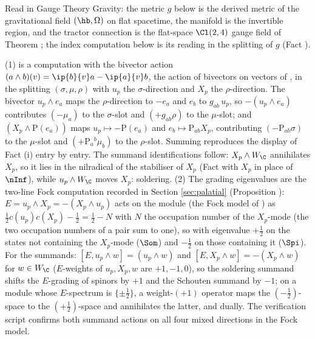 Read in Gauge Theory Gravity: the metric $g$ below is the derived metric of the gravitational field $(\hb, \Omega)$ on flat spacetime, the manifold is the invertible region, and the tractor connection is the flat-space $\Cl(2,4)$ gauge field of Theorem ; the index computation below is its reading in the splitting of $g$ (Fact ).

(1) is a computation with the bivector action $(a\wedge b)(v) = \ip{b}{v}a - \ip{a}{v}b$, the action of bivectors on vectors of , in the splitting $(\sigma, \mu, \rho)$ with $u_p$ the $\sigma$-direction and $X_p$ the $\rho$-direction. The bivector $u_p\wedge e_a$ maps the $\rho$-direction to $-e_a$ and $e_b$ to $g_{ab}\,u_p$, so $-(u_p\wedge e_a)$ contributes $(-\mu_a)$ to the $\sigma$-slot and $(+g_{ab}\rho)$ to the $\mu$-slot; and $(X_p\wedge \mathrm{P}(e_a))$ maps $u_p \mapsto -\mathrm{P}(e_a)$ and $e_b \mapsto \mathrm{P}_{ab}X_p$, contributing $(-\mathrm{P}_{ab}\sigma)$ to the $\mu$-slot and $(+\mathrm{P}_a{}^b\mu_b)$ to the $\rho$-slot. Summing reproduces the display of Fact (i) entry by entry. The summand identifications follow: $X_p\wedge W_\C$ annihilates $X_p$, so it lies in the nilradical of the stabiliser of $X_p$ (Fact  with $X_p$ in place of $\nInf$), while $u_p \wedge W_\C$ moves $X_p$: soldering.
(2) The grading eigenvalues are the two-line Fock computation recorded in Section \ref{sec:palatial} (Proposition ): $E = u_p\wedge X_p = -(X_p\wedge u_p)$ acts on the module (the Fock model of ) as $\tfrac12 c(u_p)c(X_p) - \tfrac12 = \tfrac12 - N$ with $N$ the occupation number of the $X_p$-mode (the two occupation numbers of a pair sum to one), so with eigenvalue $+\tfrac12$ on the states not containing the $X_p$-mode ($\Som$) and $-\tfrac12$ on those containing it ($\Spi$). For the summands: $[E, u_p\wedge w] = (u_p\wedge w)$ and $[E, X_p\wedge w] = -(X_p\wedge w)$ for $w \in W_\C$ ($E$-weights of $u_p, X_p, w$ are $+1, -1, 0$), so the soldering summand shifts the $E$-grading of spinors by $+1$ and the Schouten summand by $-1$; on a module whose $E$-spectrum is $\{\pm\tfrac12\}$, a weight-$(+1)$ operator maps the $(-\tfrac12)$-space to the $(+\tfrac12)$-space and annihilates the latter, and dually. The verification script confirms both summand actions on all four mixed directions in the Fock model.
